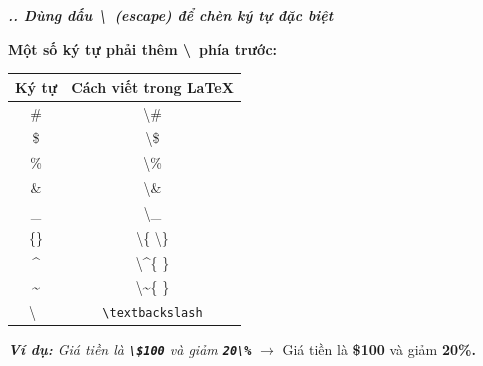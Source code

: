 \documentclass[11pt]{beamer}
\newcounter{group}
\newcommand{\slidenum}{\thegroup.\thesubslide}
\newcounter{subslide}
\begin{document}
    \begin{frame}{\textbf{\textit{\slidenum. Dùng dấu \textbackslash\ (escape) để chèn ký tự đặc biệt}}}
    	\begin{block}{\textbf{Một số ký tự phải thêm \textbackslash\ phía trước:}}
    		\begin{table}[h]
    			\begin{tabular}{|c|c|}
    				\hline
    				\rowcolor{red!80}
    				\color{white}\textbf{Ký tự} & \color{white}\textbf{Cách viết trong} \textbf{\LaTeX}\\
    				\hline
    				\# & \textbackslash\#\\
    				\hline
    				\$ & \textbackslash\$\\
    				\hline
    				\% & \textbackslash\%\\
    				\hline
    				\& & \textbackslash\&\\
    				\hline
    				\_ & \textbackslash\_\\
    				\hline
    				\{\} & \textbackslash\{ \textbackslash\}\\
    				\hline
    				\^{}&\textbackslash\textasciicircum\{ \}\\
    				\hline
    				\~{}&\textbackslash\~{}\{ \}\\
    				\hline
    				\textbackslash\ & \texttt{\textbackslash textbackslash}\\
    				\hline
    			\end{tabular}
    		\end{table}
    	\end{block}
		\textit{\textbf{Ví dụ:} Giá tiền là \textbf{\texttt{\textbackslash\$100}} và giảm \textbf{\texttt{20\textbackslash\%}}} $\to$ Giá tiền là \textbf{\$100} và giảm \textbf{20\%.}
	\end{frame}
\end{document}
